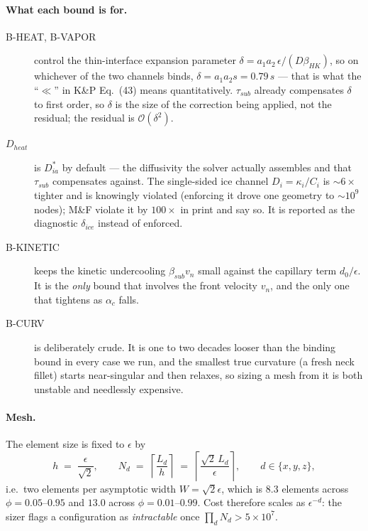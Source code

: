 \paragraph{What each bound is for.}
\begin{description}
  \item[B-HEAT, B-VAPOR] control the thin-interface expansion parameter
    $\delta = a_1 a_2\,\epsilon/(D\beta_{HK})$, so on whichever of the two
    channels binds, $\delta = a_1 a_2 s = 0.79\,s$ --- that is what the
    ``$\ll$'' in K\&P Eq.\ (43) means quantitatively. $\tau_{sub}$ already
    compensates $\delta$ to first order, so $\delta$ is the size of the
    correction being applied, not the residual; the residual is
    $\mathcal{O}(\delta^2)$.
  \item[$D_{heat}$] is $D^{*}_{ia}$ by default --- the diffusivity the solver
    actually assembles and that $\tau_{sub}$ compensates against. The
    single-sided ice channel $D_i = \kappa_i/C_i$ is $\sim6\times$ tighter and
    is knowingly violated (enforcing it drove one geometry to $\sim10^{9}$
    nodes); M\&F violate it by $100\times$ in print and say so. It is reported
    as the diagnostic $\delta_{ice}$ instead of enforced.
  \item[B-KINETIC] keeps the kinetic undercooling $\beta_{sub}v_n$ small
    against the capillary term $d_0/\epsilon$. It is the \emph{only} bound
    that involves the front velocity $v_n$, and the only one that tightens
    as $\alpha_c$ falls.
  \item[B-CURV] is deliberately crude. It is one to two decades looser than
    the binding bound in every case we run, and the smallest true curvature
    (a fresh neck fillet) starts near-singular and then relaxes, so sizing a
    mesh from it is both unstable and needlessly expensive.
\end{description}

\paragraph{Mesh.}
The element size is fixed to $\epsilon$ by
%
\begin{equation}
  h \;=\; \frac{\epsilon}{\sqrt{2}},
  \qquad
  N_d \;=\; \left\lceil \frac{L_d}{h} \right\rceil
        \;=\; \left\lceil \frac{\sqrt{2}\,L_d}{\epsilon} \right\rceil,
  \qquad d \in \{x,y,z\},
  \label{eq:mesh}
\end{equation}
%
i.e.\ two elements per asymptotic width $W = \sqrt{2}\epsilon$, which is
$8.3$ elements across $\phi = 0.05$--$0.95$ and $13.0$ across
$\phi = 0.01$--$0.99$. Cost therefore scales as $\epsilon^{-d}$: the sizer
flags a configuration as \emph{intractable} once
$\prod_d N_d > 5\times10^{7}$.

